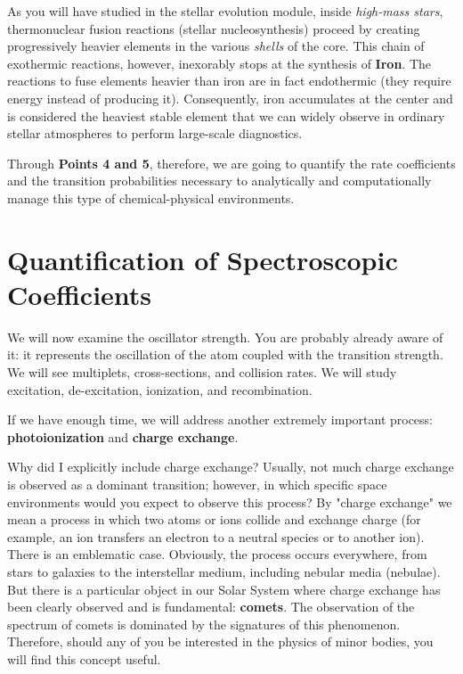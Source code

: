     As you will have studied in the stellar evolution module, inside \textit{high-mass stars}, thermonuclear fusion reactions (stellar nucleosynthesis) proceed by creating progressively heavier elements in the various \textit{shells} of the core. This chain of exothermic reactions, however, inexorably stops at the synthesis of \textbf{Iron}.
    The reactions to fuse elements heavier than iron are in fact endothermic (they require energy instead of producing it). Consequently, iron accumulates at the center and is considered the heaviest stable element that we can widely observe in ordinary stellar atmospheres to perform large-scale diagnostics.
    
    Through \textbf{Points 4 and 5}, therefore, we are going to quantify the rate coefficients and the transition probabilities necessary to analytically and computationally manage this type of chemical-physical environments.

    \section{Quantification of Spectroscopic Coefficients}

We will now examine the oscillator strength. You are probably already aware of it: it represents the oscillation of the atom coupled with the transition strength. We will see multiplets, cross-sections, and collision rates. We will study excitation, de-excitation, ionization, and recombination.

If we have enough time, we will address another extremely important process: \textbf{photoionization} and \textbf{charge exchange}.

Why did I explicitly include charge exchange? Usually, not much charge exchange is observed as a dominant transition; however, in which specific space environments would you expect to observe this process?
By "charge exchange" we mean a process in which two atoms or ions collide and exchange charge (for example, an ion transfers an electron to a neutral species or to another ion). There is an emblematic case. Obviously, the process occurs everywhere, from stars to galaxies to the interstellar medium, including nebular media (nebulae). But there is a particular object in our Solar System where charge exchange has been clearly observed and is fundamental: \textbf{comets}. The observation of the spectrum of comets is dominated by the signatures of this phenomenon. Therefore, should any of you be interested in the physics of minor bodies, you will find this concept useful.

